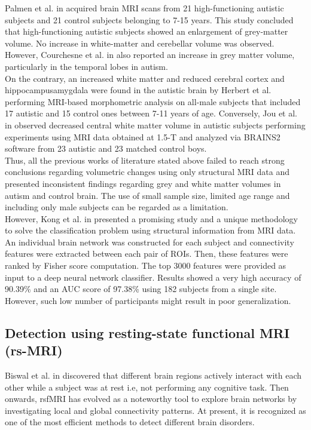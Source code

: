 Palmen et al. in \cite{palmen2005increased} acquired brain MRI scans from 21 high-functioning autistic subjects and
21 control subjects belonging to 7-15 years. This study concluded that high-functioning
autistic subjects showed an enlargement of grey-matter volume. No increase in white-matter
and cerebellar volume was observed. However, Courchesne et al. in \cite{courchesne2007mapping} also reported an
increase in grey matter volume, particularly in the temporal lobes in autism.\\

On the contrary, an increased white matter and reduced cerebral cortex and hippocampusamygdala
were found in the autistic brain by Herbert et al. \cite{herbert2003dissociations} performing MRI-based
morphometric analysis on all-male subjects that included 17 autistic and 15 control ones
between 7-11 years of age. Conversely, Jou et al. in \cite{jou2011reduced} observed decreased central white
matter volume in autistic subjects performing experiments using MRI data obtained at 1.5-T
and analyzed via BRAINS2 software from 23 autistic and 23 matched control boys.\\

Thus, all the previous works of literature stated above failed to reach strong conclusions
regarding volumetric changes using only structural MRI data and presented inconsistent
findings regarding grey and white matter volumes in autism and control brain. The use of
small sample size, limited age range and including only male subjects can be regarded as a
limitation.\\

However, Kong et al. in \cite{kong2019classification} presented a promising study and a unique methodology to solve
the classification problem using structural information from MRI data. An individual brain
network was constructed for each subject and connectivity features were extracted between
each pair of ROIs. Then, these features were ranked by Fisher score computation. The top
3000 features were provided as input to a deep neural network classifier. Results showed a
very high accuracy of 90.39\% and an AUC score of 97.38\% using 182 subjects from a single
site. However, such low number of participants might result in poor generalization.\\

\subsection{Detection using resting-state functional MRI (rs-MRI)}
Biswal et al. in \cite{biswal1995functional} discovered that different brain regions actively interact with each
other while a subject was at rest i.e, not performing any cognitive task. Then onwards, rsfMRI
has evolved as a noteworthy tool to explore brain networks by investigating local and
global connectivity patterns. At present, it is recognized as one of the most efficient methods
to detect different brain disorders.\\

